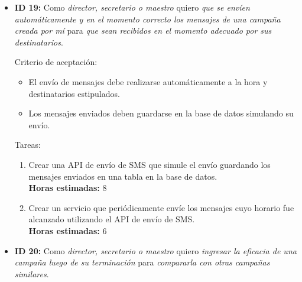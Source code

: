 \documentclass[a4paper, 10pt, twoside]{article}
\newenvironment{stories}{
  \begin{itemize}
}{
  \end{itemize}
}
\newcommand{\storyid}[4]{
  \item
  \textbf{ID #1:} Como \emph{#2} quiero \emph{#3} para \emph{#4}.
}
\newenvironment{tasks}{
  Tareas:
  \begin{enumerate}
}{
  \end{enumerate}
}
\newcommand{\task}[1] {
  \item #1.\\
  \textbf{Horas estimadas:}
}
\newenvironment{criterios}{
  Criterio de aceptación:
  \begin{itemize}
}{
  \end{itemize}
}
\newcommand{\criteria}[1] {
  \item #1
}
\begin{document}
\begin{stories}
   \begin{criterios}
    \criteria{El conjunto de todas mis campañas debe ser visible.}
    \criteria{El mensaje modificado pertenece a una de mis campañas.}
  	\criteria{El mensaje modificado no puede ser vacío.}
    \criteria{La hora del mensaje modificado es válida.}
    \criteria{La hora del mensaje modificado es distinta a la del resto de los mensajes de la campaña de la misma fecha.}
    \criteria{El tipo de mensaje modificado es de alguno de los cuatro tipos permitidos.}
    \criteria{El mensaje eliminado debe pertenecer a una de mis campañas.}
  \end{criterios} 

  \begin{tasks}
    \task{Crear una interfaz que liste todas las campañas creadas por el usuario actual} 3
    \task{Crear interacción que muestre el formulario de edición de la campaña cuando se la selecciona en la lista anterior} 2
    \task{Modificar formulario de edición de campaña y sus componentes para que tenga precargados los datos de una campaña existente y permita modificarla} 0.5
    \task{Modificar código de persistencia de campañas para que permita guardar cambios en una campaña existente} 0.5
  \end{tasks}


  \storyid{19}{director, secretario o maestro}
             {que se envíen automáticamente y en el momento correcto los mensajes de una campaña creada por mí}
             {que sean recibidos en el momento adecuado por sus destinatarios}
  
   \begin{criterios}
    \criteria{El envío de mensajes debe realizarse automáticamente a la hora y destinatarios estipulados.}
  	\criteria{Los mensajes enviados deben guardarse en la base de datos simulando su envío.}
  \end{criterios} 

  \begin{tasks}
    \task{Crear una API de envío de SMS que simule el envío guardando los mensajes enviados en una tabla en la base de datos} 8
    \task{Crear un servicio que periódicamente envíe los mensajes cuyo horario fue alcanzado utilizando el API de envío de SMS} 6
  \end{tasks}


  \storyid{20}{director, secretario o maestro}
             {ingresar la eficacia de una campaña luego de su terminación}
             {compararla con otras campañas similares}
        

\end{stories}
\end{document}
